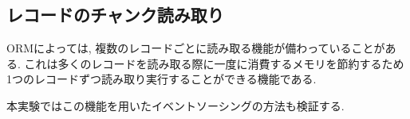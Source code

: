 \documentclass[../../../main]{subfiles}
\begin{document}
    \subsection{レコードのチャンク読み取り}\label{subsec:phraseology-record_chunk_read}

    ORMによっては, 複数のレコードごとに読み取る機能が備わっていることがある. これは多くのレコードを読み取る際に一度に消費するメモリを節約するため1つのレコードずつ読み取り実行することができる機能である.

    本実験ではこの機能を用いたイベントソーシングの方法も検証する.
\end{document}
